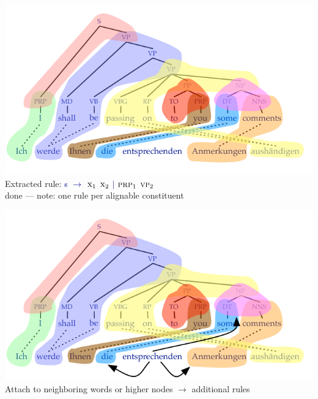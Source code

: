 \documentclass[landscape]{slides}
\newcommand{\example}[1]{\textcolor{darkblue}{\rm #1}}
\begin{document}
\vspace{-4mm}
\begin{center}
\includegraphics[scale=2.1]{minimal-rules9.pdf}\\[-9mm]
Extracted rule: \example{{\sc s} $\rightarrow$ $\text{\sc x}_1$ $\text{\sc x}_2$ $|$ $\text{\sc prp}_1$ $\text{\sc vp}_2$}\\
{\sc done} --- note: one rule per alignable constituent
\end{center}


\vspace{-6mm}
\begin{center}
\includegraphics[scale=2.1]{minimal-rules-unaligned.pdf}\\[-1mm]
Attach to neighboring words or higher nodes $\rightarrow$ additional rules
\end{center}

\end{document}
